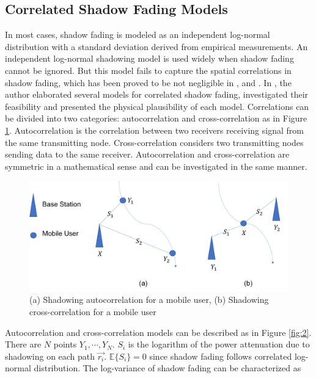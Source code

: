 \subsection{Correlated Shadow Fading Models}
\label{subsec:2}
\par In most cases, shadow fading is modeled as an independent log-normal distribution \cite{goldsmith2005wireless} with a standard deviation derived from empirical measurements. An independent log-normal shadowing model is used widely when shadow fading cannot be ignored. But this model fails to capture the spatial correlations in shadow fading, which has been proved to be not negligible in \cite{graziano1978propagation}, \cite{marsan1990shadowing} and \cite{liberti1992statistics}. In \cite{szyszkowicz2010feasibility}, the author elaborated several models for correlated shadow fading,  investigated their feasibility and presented the physical plausibility of each model. Correlations can be divided into two categories: autocorrelation and cross-correlation as in Figure \ref{fig:1}. Autocorrelation is the correlation between two receivers receiving signal from the same transmitting node. Cross-correlation considers two transmitting nodes sending data to the same receiver. Autocorrelation and cross-correlation are symmetric in a mathematical sense and can be investigated in the same manner.
\begin{figure} 
\centering
\includegraphics[width=14cm]{correlation.png}
\caption{(a) Shadowing autocorrelation for a mobile user, (b) Shadowing cross-correlation for a mobile user}
\label{fig:1}
\end{figure}
\par Autocorrelation and cross-correlation models can be described as in Figure \ref{fig:2}. There are $N$ points $Y_{1}, \cdots, Y_{N}$.  $S_{i}$ is the logarithm of the power attenuation due to shadowing on each path $\vec{r_{i}}$. $\mathbb{E}\{S_{i}\} = 0$ since shadow fading follows correlated log-normal distribution. The log-variance of shadow fading can be characterized as 

